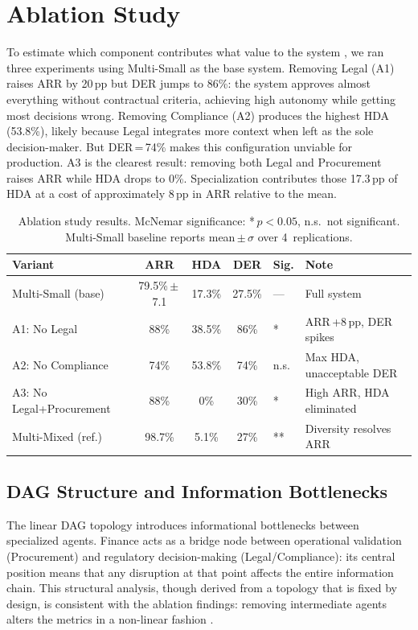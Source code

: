 \documentclass[preprint,12pt,numrefs]{elsarticle}
\begin{document}
\section{Ablation Study}
\label{sec:ablation}
To estimate which component contributes what value to the system
\citep{Bubeck2023sparks}, we ran three experiments using Multi-Small
as the base system.
Removing Legal (A1) raises ARR by 20\,pp but DER jumps to 86\%: the
system approves almost everything without contractual criteria, achieving
high autonomy while getting most decisions wrong. Removing Compliance
(A2) produces the highest HDA (53.8\%), likely because Legal integrates
more context when left as the sole decision-maker. But DER\,=\,74\%
makes this configuration unviable for production. A3 is the clearest
result: removing both Legal and Procurement raises ARR while HDA drops
to 0\%. Specialization contributes those 17.3\,pp of HDA at a cost of
approximately 8\,pp in ARR relative to the mean.
\begin{table}[H]
\centering
\small
\caption{Ablation study results. McNemar significance:
         *\,$p<0.05$, n.s.\ not significant. Multi-Small baseline
         reports mean\,$\pm$\,$\sigma$ over 4~replications.}
\label{tab:ablation}
\begin{tabular}{lccclp{3.5cm}}
\toprule
\textbf{Variant} & \textbf{ARR} & \textbf{HDA} & \textbf{DER} & \textbf{Sig.} & \textbf{Note} \\
\midrule
Multi-Small (base)        & 79.5\%\,$\pm$\,7.1 & 17.3\% & 27.5\% & ---  & Full system \\
A1: No Legal              & 88\%   & 38.5\% & 86\% & *    & ARR\,+8\,pp, DER spikes \\
A2: No Compliance         & 74\%   & 53.8\% & 74\% & n.s. & Max HDA, unacceptable DER \\
A3: No Legal+Procurement  & 88\%   & 0\%    & 30\% & *    & High ARR, HDA eliminated \\
Multi-Mixed (ref.)        & 98.7\% & 5.1\%  & 27\% & **   & Diversity resolves ARR \\
\bottomrule
\end{tabular}
\end{table}


\subsection{DAG Structure and Information Bottlenecks}

The linear DAG topology introduces informational bottlenecks between
specialized agents. Finance acts as a bridge node between operational
validation (Procurement) and regulatory decision-making
(Legal/Compliance): its central position means that any disruption at
that point affects the entire information chain. This structural
analysis, though derived from a topology that is fixed by design, is
consistent with the ablation findings: removing intermediate agents
alters the metrics in a non-linear fashion
\citep{Freeman1977betweenness,granovetter1973}.
\end{document}
